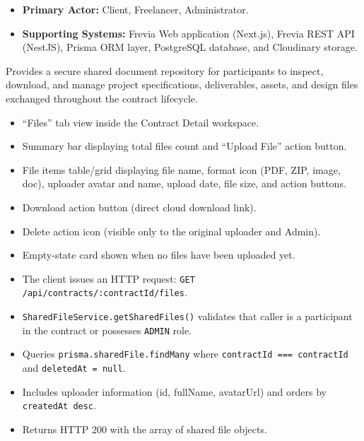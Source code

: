 
\begin{itemize}[leftmargin=1.6em,topsep=3pt,itemsep=2pt,parsep=0pt,label=$\bullet$]
      \item \textbf{Primary Actor:} Client, Freelancer, Administrator.
      \item \textbf{Supporting Systems:} Frevia Web application (Next.js), Frevia REST API (NestJS), Prisma ORM layer, PostgreSQL database, and Cloudinary storage.
\end{itemize}

\noindent Provides a secure shared document repository for participants to inspect, download, and manage project specifications, deliverables, assets, and design files exchanged throughout the contract lifecycle.

\begin{itemize}[leftmargin=1.6em,topsep=3pt,itemsep=2pt,parsep=0pt,label=$\bullet$]
      \item ``Files'' tab view inside the Contract Detail workspace.
      \item Summary bar displaying total files count and ``Upload File'' action button.
      \item File items table/grid displaying file name, format icon (PDF, ZIP, image, doc), uploader avatar and name, upload date, file size, and action buttons.
      \item Download action button (direct cloud download link).
      \item Delete action icon (visible only to the original uploader and Admin).
      \item Empty-state card shown when no files have been uploaded yet.
\end{itemize}

\begin{itemize}[leftmargin=1.6em,topsep=3pt,itemsep=2pt,parsep=0pt,label=$\bullet$]
      \item The client issues an HTTP request: \texttt{GET /api/contracts/:contractId/files}.
      \item \texttt{SharedFileService.getSharedFiles()} validates that caller is a participant in the contract or possesses \texttt{ADMIN} role.
      \item Queries \texttt{prisma.sharedFile.findMany} where \texttt{contractId === contractId} and \texttt{deletedAt = null}.
      \item Includes uploader information (id, fullName, avatarUrl) and orders by \texttt{createdAt desc}.
      \item Returns HTTP 200 with the array of shared file objects.
\end{itemize}

